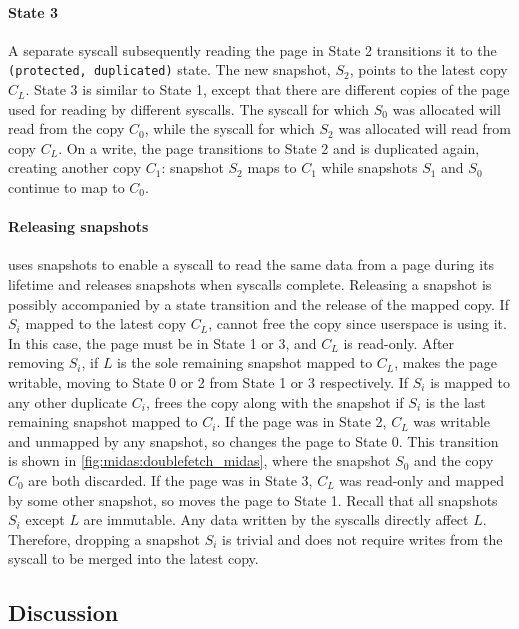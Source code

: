 \paragraph{State 3}
A separate syscall subsequently reading the page in State 2 transitions
it to the \texttt{(protected, duplicated)} state.
The new snapshot, $S_2$, points to the latest copy $C_L$.
State 3 is similar to State 1, except that there are different copies of
the page used for reading by different syscalls.
The syscall for which $S_0$ was allocated will read from the copy $C_0$,
while the syscall for which $S_2$ was allocated will read from copy $C_L$.
On a write, the page transitions to State 2 and is duplicated again,
creating another copy $C_1$: snapshot $S_2$ maps to $C_1$ while
snapshots $S_1$ and $S_0$ continue to map to $C_0$.

\paragraph{Releasing snapshots}
\midas uses snapshots to enable a syscall to read the same data from a page
during its lifetime and releases snapshots when syscalls complete.
Releasing a snapshot is possibly accompanied by a state transition
and the release of the mapped copy.
If $S_i$ mapped to the latest copy $C_L$, \midas cannot free the copy
since userspace is using it.
In this case, the page must be in State 1 or 3, and $C_L$ is read-only.
After removing $S_i$, if $L$ is the sole remaining snapshot mapped to $C_L$,
\midas makes the page writable, moving to State 0 or 2 from State
1 or 3 respectively.
If $S_i$ is mapped to any other duplicate $C_i$, \midas frees the copy along
with the snapshot if $S_i$ is the last remaining snapshot mapped to $C_i$.
If the page was in State 2, $C_L$ was writable and unmapped by any snapshot,
so \midas changes the page to State 0.
This transition is shown in \autoref{fig:midas:doublefetch_midas}, where the
snapshot $S_0$ and the copy $C_0$ are both discarded.
If the page was in State 3, $C_L$ was read-only and mapped by some other
snapshot, so \midas moves the page to State 1.
Recall that all snapshots $S_i$ except $L$ are immutable.
Any data written by the syscalls directly affect $L$.
Therefore, dropping a snapshot $S_i$ is trivial and does not require
writes from the syscall to be merged into the latest copy.

\subsection{Discussion}
\label{sec:midas:design:discussion}


